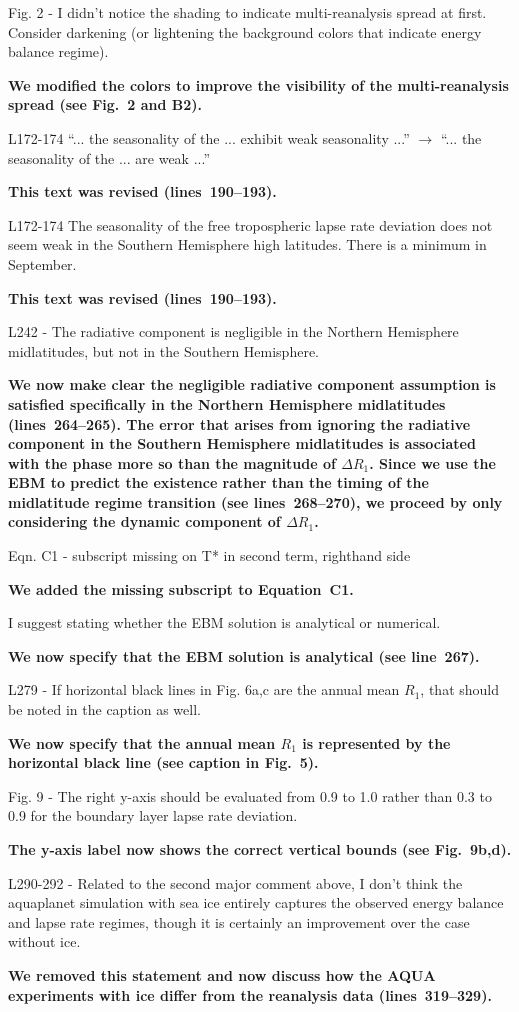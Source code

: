 \documentclass{article}
\begin{document}
Fig. 2 - I didn't notice the shading to indicate multi-reanalysis spread at first. Consider darkening (or lightening the background colors that indicate energy balance regime).

\textbf{We modified the colors to improve the visibility of the multi-reanalysis spread (see Fig.~2 and B2).}

L172-174 ``... the seasonality of the ... exhibit weak seasonality ...'' $\rightarrow$ ``... the seasonality of the ... are weak ...''

\textbf{This text was revised (lines~190--193).}

L172-174 The seasonality of the free tropospheric lapse rate deviation does not seem weak in the Southern Hemisphere high latitudes. There is a minimum in September.

\textbf{This text was revised (lines~190--193).}

L242 - The radiative component is negligible in the Northern Hemisphere midlatitudes, but not in the Southern Hemisphere.

\textbf{We now make clear the negligible radiative component assumption is satisfied specifically in the Northern Hemisphere midlatitudes (lines~264--265). The error that arises from ignoring the radiative component in the Southern Hemisphere midlatitudes is associated with the phase more so than the magnitude of $\Delta R_1$. Since we use the EBM to predict the existence rather than the timing of the midlatitude regime transition (see lines~268--270), we proceed by only considering the dynamic component of $\Delta R_1$.}

Eqn. C1 - subscript missing on T* in second term, righthand side

\textbf{We added the missing subscript to Equation~C1.}

I suggest stating whether the EBM solution is analytical or numerical.

\textbf{We now specify that the EBM solution is analytical (see line~267).}

L279 - If horizontal black lines in Fig. 6a,c are the annual mean $R_1$, that should be noted in the caption as well.

\textbf{We now specify that the annual mean $R_1$ is represented by the horizontal black line (see caption in Fig.~5).}

Fig. 9 - The right y-axis should be evaluated from 0.9 to 1.0 rather than 0.3 to 0.9 for the boundary layer lapse rate deviation.

\textbf{The y-axis label now shows the correct vertical bounds (see Fig.~9b,d).}

L290-292 - Related to the second major comment above, I don't think the aquaplanet simulation with sea ice entirely captures the observed energy balance and lapse rate regimes, though it is certainly an improvement over the case without ice.

\textbf{We removed this statement and now discuss how the AQUA experiments with ice differ from the reanalysis data (lines~319--329).}


\newsavebox\mytempbib
\savebox\mytempbib{\parbox{\textwidth}{}}
\end{document}
